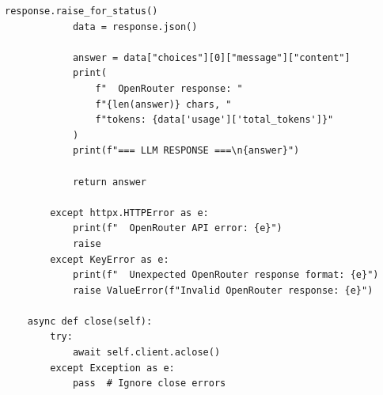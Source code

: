 \begin{lstlisting}[basicstyle=\tiny\ttfamily,breaklines=true]
            response.raise_for_status()
            data = response.json()

            answer = data["choices"][0]["message"]["content"]
            print(
                f"  OpenRouter response: "
                f"{len(answer)} chars, "
                f"tokens: {data['usage']['total_tokens']}"
            )
            print(f"=== LLM RESPONSE ===\n{answer}")

            return answer

        except httpx.HTTPError as e:
            print(f"  OpenRouter API error: {e}")
            raise
        except KeyError as e:
            print(f"  Unexpected OpenRouter response format: {e}")
            raise ValueError(f"Invalid OpenRouter response: {e}")

    async def close(self):
        try:
            await self.client.aclose()
        except Exception as e:
            pass  # Ignore close errors
\end{lstlisting}
